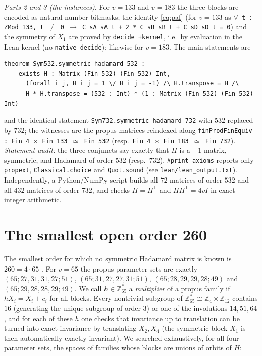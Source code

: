 \documentclass[11pt]{article}
\numberwithin{equation}{section}
\theoremstyle{definition}
\theoremstyle{remark}
\newcommand{\Z}{\mathbb Z}
\begin{document}
\emph{Parts 2 and 3 (the instances).} For $v=133$ and $v=183$ the three blocks are encoded as
natural-number bitmasks; the identity \eqref{eq:paf} (for $v=133$ as \texttt{$\forall$ t : ZMod 133, t $\ne$ 0 $\to$ C sA sA t + 2 * C sB sB t + C sD sD t = 0}) and the
symmetry of $X_1$ are proved by \texttt{decide +kernel}, i.e.\ by evaluation in the Lean kernel
(no \texttt{native\_decide}); likewise for $v=183$. The main statements are
\begin{verbatim}
theorem Sym532.symmetric_hadamard_532 :
    exists H : Matrix (Fin 532) (Fin 532) Int,
      (forall i j, H i j = 1 \/ H i j = -1) /\ H.transpose = H /\
      H * H.transpose = (532 : Int) * (1 : Matrix (Fin 532) (Fin 532) Int)
\end{verbatim}
and the identical statement \texttt{Sym732.symmetric\_hadamard\_732} with $532$ replaced by $732$;
the witnesses are the propus matrices reindexed along \texttt{finProdFinEquiv : Fin 4 $\times$ Fin 133 $\simeq$ Fin 532}
(resp.\ \texttt{Fin 4 $\times$ Fin 183 $\simeq$ Fin 732}).
\emph{Statement audit:} the three conjuncts say exactly that $H$ is a $\pm1$ matrix, symmetric, and
Hadamard of order $532$ (resp.\ $732$). \texttt{\#print axioms} reports only \texttt{propext}, \texttt{Classical.choice}
and \texttt{Quot.sound} (see \texttt{lean/lean\_output.txt}). Independently, a Python/NumPy script
builds all $72$ matrices of order $532$ and all $432$ matrices of order $732$, and checks
$H=H^{\mathsf T}$ and $HH^{\mathsf T}=4vI$ in exact integer arithmetic.

\section{The smallest open order 260}\label{sec:65}
The smallest order for which no symmetric Hadamard matrix is known is $260=4\cdot65$
\cite{ABDK19,Dj24}. For $v=65$ the propus parameter sets are exactly
$(65;27,31,31,27;51)$, $(65;31,27,27,31;51)$, $(65;28,29,29,28;49)$ and $(65;29,28,28,29;49)$.
We call $h\in\Z_{65}^{*}$ a \emph{multiplier} of a propus family if $hX_i=X_i+c_i$ for all blocks.
Every nontrivial subgroup of $\Z_{65}^{*}\cong\Z_4\times\Z_{12}$ contains $16$ (generating the unique
subgroup of order $3$) or one of the involutions $14,51,64$, and for each of these $h$ one checks that
invariance up to translation can be turned into exact invariance by translating $X_2,X_4$ (the
symmetric block $X_1$ is then automatically exactly invariant). We searched exhaustively, for all four
parameter sets, the spaces of families whose blocks are unions of orbits of $H$:
\end{document}
